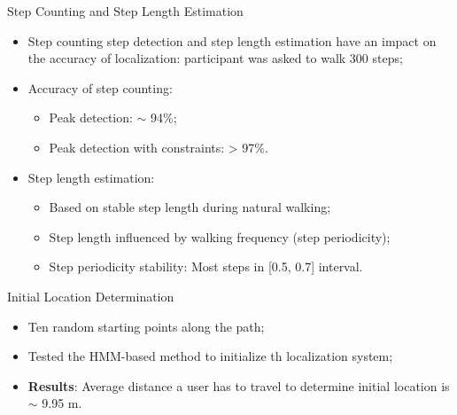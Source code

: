 \begin{frame}{Step Counting and Step Length Estimation}
    \begin{itemize}
        \item Step counting step detection and step length estimation have an impact on the accuracy of localization: participant was asked to walk 300 steps;
        \item Accuracy of step counting:
            \begin{itemize}
                \item Peak detection: $\sim$ 94\%;
                \item Peak detection with constraints: > 97\%.
            \end{itemize}
        \item Step length estimation:
            \begin{itemize}
                \item Based on stable step length during natural walking;
                \item Step length influenced by walking frequency (step periodicity);
                \item Step periodicity stability: Most steps in [0.5, 0.7] interval.
            \end{itemize}
    \end{itemize}
\end{frame}

\begin{frame}{Initial Location Determination}
    \begin{itemize}
        \item Ten random starting points along the path;
        \item Tested the HMM-based method to initialize th localization system;
        \item \textbf{Results}: Average distance a user has to travel to determine initial location is $\sim$ 9.95 m.
    \end{itemize}
\end{frame}

